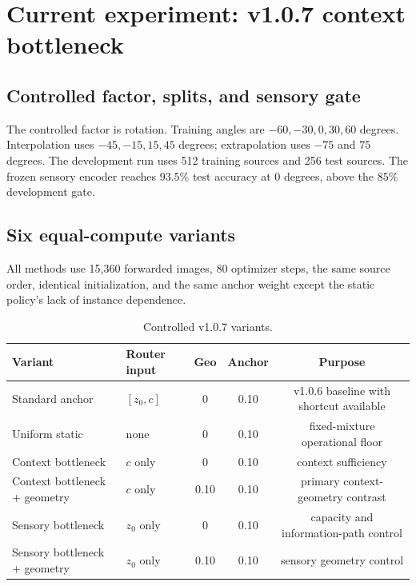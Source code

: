 \documentclass[11pt,a4paper]{article}
\begin{document}
\section{Current experiment: v1.0.7 context bottleneck}

\subsection{Controlled factor, splits, and sensory gate}

The controlled factor is rotation. Training angles are $-60,-30,0,30,60$ degrees. Interpolation uses $-45,-15,15,45$ degrees; extrapolation uses $-75$ and $75$ degrees. The development run uses 512 training sources and 256 test sources. The frozen sensory encoder reaches $93.5\%$ test accuracy at $0$ degrees, above the $85\%$ development gate.

\subsection{Six equal-compute variants}

All methods use 15,360 forwarded images, 80 optimizer steps, the same source order, identical initialization, and the same anchor weight except the static policy's lack of instance dependence.

\begin{table}[H]
\centering
\small
\begin{tabularx}{\textwidth}{p{4.0cm}Yccc}
\toprule
\textbf{Variant} & \textbf{Router input} & \textbf{Geo} & \textbf{Anchor} & \textbf{Purpose}\\
\midrule
Standard anchor & $[z_0,c]$ & 0 & 0.10 & v1.0.6 baseline with shortcut available\\
Uniform static & none & 0 & 0.10 & fixed-mixture operational floor\\
Context bottleneck & $c$ only & 0 & 0.10 & context sufficiency\\
Context bottleneck + geometry & $c$ only & 0.10 & 0.10 & primary context-geometry contrast\\
Sensory bottleneck & $z_0$ only & 0 & 0.10 & capacity and information-path control\\
Sensory bottleneck + geometry & $z_0$ only & 0.10 & 0.10 & sensory geometry control\\
\bottomrule
\end{tabularx}
\caption{Controlled v1.0.7 variants.}
\end{table}
\end{document}
